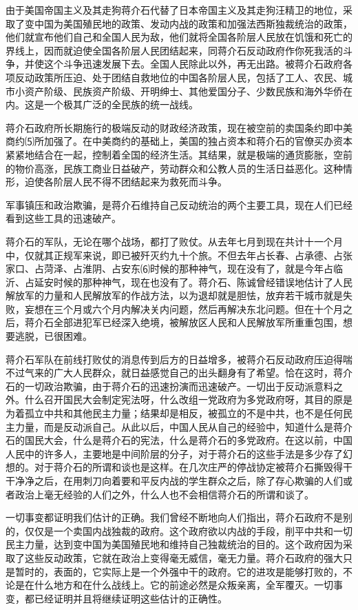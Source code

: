 \documentclass[UTF-8, a5paper, 12pt]{ctexart}
\begin{document}
由于美国帝国主义及其走狗蒋介石代替了日本帝国主义及其走狗汪精卫的地位，采取了变中国为美国殖民地的政策、发动内战的政策和加强法西斯独裁统治的政策，他们就宣布他们自己和全国人民为敌，他们就将全国各阶层人民放在饥饿和死亡的界线上，因而就迫使全国各阶层人民团结起来，同蒋介石反动政府作你死我活的斗争，并使这个斗争迅速发展下去。全国人民除此以外，再无出路。被蒋介石政府各项反动政策所压迫、处于团结自救地位的中国各阶层人民，包括了工人、农民、城市小资产阶级、民族资产阶级、开明绅士、其他爱国分子、少数民族和海外华侨在内。这是一个极其广泛的全民族的统一战线。

蒋介石政府所长期施行的极端反动的财政经济政策，现在被空前的卖国条约即中美商约⑸所加强了。在中美商约的基础上，美国的独占资本和蒋介石的官僚买办资本紧紧地结合在一起，控制着全国的经济生活。其结果，就是极端的通货膨胀，空前的物价高涨，民族工商业日益破产，劳动群众和公教人员的生活日益恶化。这种情形，迫使各阶层人民不得不团结起来为救死而斗争。

军事镇压和政治欺骗，是蒋介石维持自己反动统治的两个主要工具，现在人们已经看到这些工具的迅速破产。

蒋介石的军队，无论在哪个战场，都打了败仗。从去年七月到现在共计十一个月中，仅就其正规军来说，即已被歼灭约九十个旅。不但去年占长春、占承德、占张家口、占菏泽、占淮阴、占安东⑹时候的那种神气，现在没有了，就是今年占临沂、占延安时候的那种神气，现在也没有了。蒋介石、陈诚曾经错误地估计了人民解放军的力量和人民解放军的作战方法，以为退却就是胆怯，放弃若干城市就是失败，妄想在三个月或六个月内解决关内问题，然后再解决东北问题。但在十个月之后，蒋介石全部进犯军已经深入绝境，被解放区人民和人民解放军所重重包围，想要逃脱，已很困难。

蒋介石军队在前线打败仗的消息传到后方的日益增多，被蒋介石反动政府压迫得喘不过气来的广大人民群众，就日益感觉自己的出头翻身有了希望。恰在这时，蒋介石的一切政治欺骗，由于蒋介石的迅速扮演而迅速破产。一切出于反动派意料之外。什么召开国民大会制定宪法呀，什么改组一党政府为多党政府呀，其目的原是为着孤立中共和其他民主力量；结果却是相反，被孤立的不是中共，也不是任何民主力量，而是反动派自己。从此以后，中国人民从自己的经验中，知道什么是蒋介石的国民大会，什么是蒋介石的宪法，什么是蒋介石的多党政府。在这以前，中国人民中的许多人，主要地是中间阶层的分子，对于蒋介石的这些手法是多少存了幻想的。对于蒋介石的所谓和谈也是这样。在几次庄严的停战协定被蒋介石撕毁得干干净净之后，在用刺刀向着要和平反内战的学生群众之后，除了存心欺骗的人们或者政治上毫无经验的人们之外，什么人也不会相信蒋介石的所谓和谈了。

一切事变都证明我们估计的正确。我们曾经不断地向人们指出，蒋介石政府不是别的，仅仅是一个卖国内战独裁的政府。这个政府欲以内战的手段，削平中共和一切民主力量，达到变中国为美国殖民地和维持自己独裁统治的目的。这个政府因为采取了这些反动政策，它就在政治上变得毫无威信，毫无力量。蒋介石政府的强大只是暂时的，表面的，它实际上是一个外强中干的政府。它的进攻是能够打败的，不论是在什么地方和在什么战线上。它的前途必然是众叛亲离，全军覆灭。一切事变，都已经证明并且将继续证明这些估计的正确性。
\end{document}
